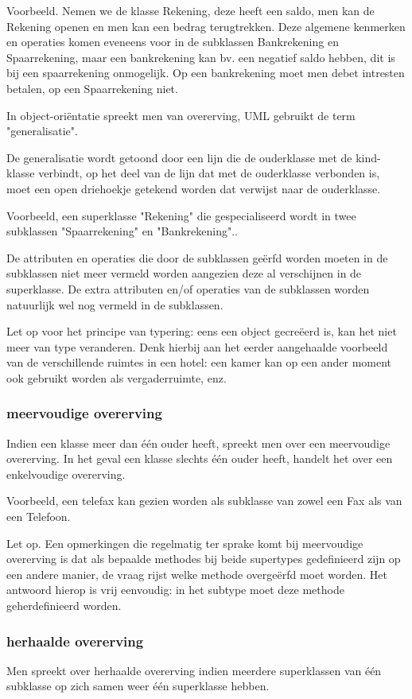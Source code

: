 Voorbeeld. Nemen we de klasse Rekening, deze heeft een saldo, men kan de Rekening openen en men kan een bedrag terugtrekken. Deze algemene kenmerken en operaties komen eveneens voor in de subklassen Bankrekening en Spaarrekening, maar een bankrekening kan bv. een negatief saldo hebben, dit is bij een spaarrekening onmogelijk. Op een bankrekening moet men debet intresten betalen, op een Spaarrekening niet.

In object-oriëntatie spreekt men van overerving, UML gebruikt de term "generalisatie".

De generalisatie wordt getoond door een lijn die de ouderklasse met de kind- klasse verbindt, op het deel van de lijn dat met de ouderklasse verbonden is, moet een open driehoekje getekend worden dat verwijst naar de ouderklasse.

Voorbeeld, een superklasse "Rekening" die gespecialiseerd wordt in twee subklassen "Spaarrekening" en "Bankrekening"..

De attributen en operaties die door de subklassen geërfd worden moeten in de subklassen niet meer vermeld worden aangezien deze al verschijnen in de superklasse. De extra attributen en/of operaties van de subklassen worden natuurlijk wel nog vermeld in de subklassen.

Let op voor het principe van typering: eens een object gecreëerd is, kan het niet meer van type veranderen. Denk hierbij aan het eerder aangehaalde voorbeeld van de verschillende ruimtes in een hotel: een kamer kan op een ander moment ook gebruikt worden als vergaderruimte, enz.
\subsubsection{meervoudige overerving}

Indien een klasse meer dan één ouder heeft, spreekt men over een meervoudige overerving. In het geval een klasse slechts één ouder heeft, handelt het over een enkelvoudige overerving.

Voorbeeld, een telefax kan gezien worden als subklasse van zowel een Fax als van een Telefoon.

Let op. Een opmerkingen die regelmatig ter sprake komt bij meervoudige overerving is dat als bepaalde methodes bij beide supertypes gedefinieerd zijn op een andere manier, de vraag rijst welke methode overgeërfd moet worden. Het antwoord hierop is vrij eenvoudig: in het subtype moet deze methode geherdefinieerd worden.

\subsubsection{herhaalde overerving}
Men spreekt over herhaalde overerving indien meerdere superklassen van één subklasse op zich samen weer één superklasse hebben.

